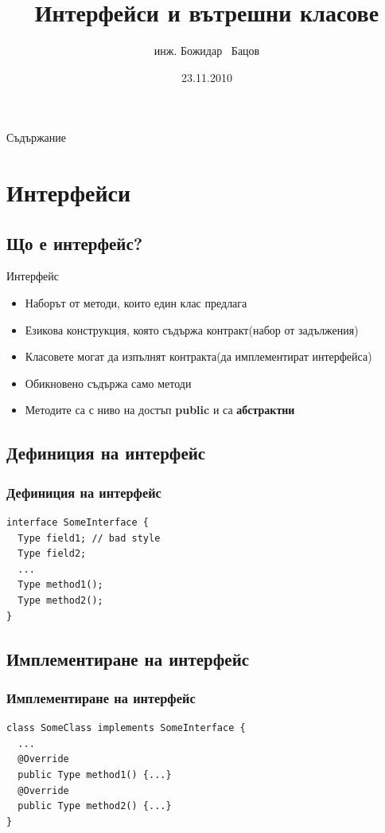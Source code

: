 \documentclass{beamer}
\title{Интерфейси и вътрешни класове}
\author{инж. Божидар ~Бацов}
\institute{Drow Ltd.}
\date{23.11.2010}
\begin{document}
\begin{frame}
  \titlepage
\end{frame}

\begin{frame}{Съдържание}
  
  \tableofcontents
\end{frame}

\section{Интерфейси}

\subsection{Що е интерфейс?}
\begin{frame}{Интерфейс}
  
  \begin{itemize}
  \item
    Наборът от методи, които един клас предлага 
  \item
    Езикова конструкция, която съдържа контракт(набор
    от задължения) 
  \item Класовете могат да изпълнят контракта(да имплементират
    интерфейса) 
  \item Обикновено съдържа само методи 
  \item Методите са с ниво на достъп \textbf{public} и са \textbf{абстрактни}
  \end{itemize}
\end{frame}

\subsection{Дефиниция на интерфейс}
\begin{frame}[fragile]
  \frametitle{Дефиниция на интерфейс}
  
\begin{lstlisting}
interface SomeInterface {
  Type field1; // bad style
  Type field2;
  ...
  Type method1();
  Type method2();
}
\end{lstlisting}
\end{frame}

\subsection{Имплементиране на интерфейс}
\begin{frame}[fragile]
  \frametitle{Имплементиране на интерфейс}
  
\begin{lstlisting}
class SomeClass implements SomeInterface {
  ...  
  @Override
  public Type method1() {...}
  @Override
  public Type method2() {...}
}
\end{lstlisting}
\end{frame}
\end{document}

